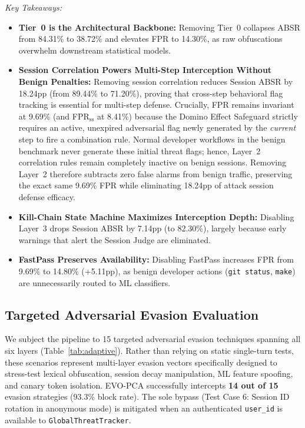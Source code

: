 \documentclass[conference]{IEEEtran}
\begin{document}
\textit{Key Takeaways:}
\begin{itemize}[leftmargin=*]
    \item \textbf{Tier~0 is the Architectural Backbone:} Removing Tier~0 collapses ABSR from 84.31\% to 38.72\% and elevates FPR to 14.30\%, as raw obfuscations overwhelm downstream statistical models.
    \item \textbf{Session Correlation Powers Multi-Step Interception Without Benign Penalties:} Removing session correlation reduces Session ABSR by 18.24pp (from 89.44\% to 71.20\%), proving that cross-step behavioral flag tracking is essential for multi-step defense. Crucially, FPR remains invariant at 9.69\% (and FPR$_{\text{ss}}$ at 8.41\%) because the Domino Effect Safeguard strictly requires an active, unexpired adversarial flag newly generated by the \textit{current} step to fire a combination rule. Normal developer workflows in the benign benchmark never generate these initial threat flags; hence, Layer~2 correlation rules remain completely inactive on benign sessions. Removing Layer~2 therefore subtracts zero false alarms from benign traffic, preserving the exact same 9.69\% FPR while eliminating 18.24pp of attack session defense efficacy.
    \item \textbf{Kill-Chain State Machine Maximizes Interception Depth:} Disabling Layer~3 drops Session ABSR by 7.14pp (to 82.30\%), largely because early warnings that alert the Session Judge are eliminated.
    \item \textbf{FastPass Preserves Availability:} Disabling FastPass increases FPR from 9.69\% to 14.80\% (+5.11pp), as benign developer actions (\texttt{git status}, \texttt{make}) are unnecessarily routed to ML classifiers.
\end{itemize}

\subsection{Targeted Adversarial Evasion Evaluation}
We subject the pipeline to 15 targeted adversarial evasion techniques spanning all six layers (Table~\ref{tab:adaptive}). Rather than relying on static single-turn tests, these scenarios represent multi-layer evasion vectors specifically designed to stress-test lexical obfuscation, session decay manipulation, ML feature spoofing, and canary token isolation. EVO-PCA successfully intercepts \textbf{14 out of 15} evasion strategies (93.3\% block rate). The sole bypass (Test Case 6: Session ID rotation in anonymous mode) is mitigated when an authenticated \texttt{user\_id} is available to \texttt{GlobalThreatTracker}.
\end{document}
